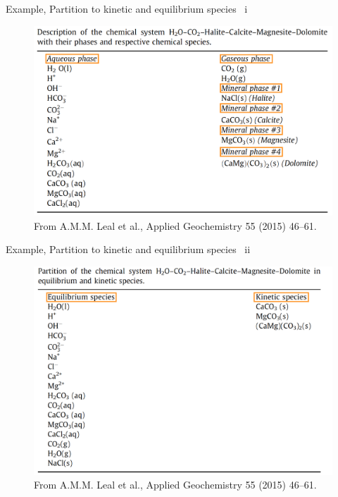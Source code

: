 %
%
\begin{frame}{Example, Partition to kinetic and equilibrium species \, i}
	\begin{figure}
		\centering
		\includegraphics[height=0.85\textheight]{figures/chemical-kinetics/partitioning-example-1.png}
		\caption*{From A.M.M. Leal et al., Applied Geochemistry 55 (2015) 46--61.}
	\end{figure}
\end{frame}
%
\begin{frame}{Example, Partition to kinetic and equilibrium species \, ii}
	\begin{figure}
		\centering
		\includegraphics[height=0.85\textheight]{figures/chemical-kinetics/partitioning-example-2.png}
		\caption*{From A.M.M. Leal et al., Applied Geochemistry 55 (2015) 46--61.}
	\end{figure}
\end{frame}
